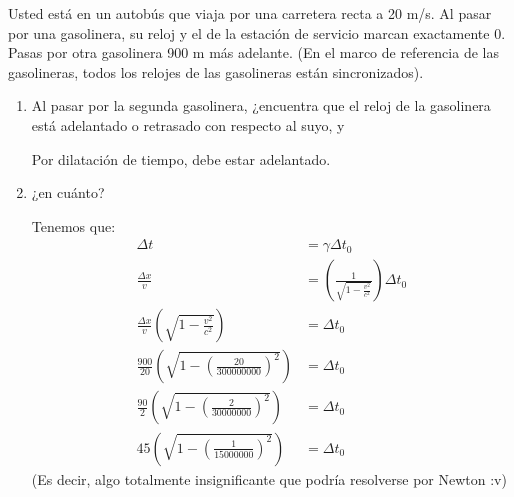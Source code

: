 \begin{problema}
    Usted está en un autobús que viaja por una carretera recta a 20 m/s. Al pasar por una gasolinera, su reloj y el de la estación de servicio marcan exactamente 0. Pasas por otra gasolinera 900 m más adelante. (En el marco de referencia de las gasolineras, todos los relojes de las gasolineras están sincronizados). 
\begin{enumerate}
    \item Al pasar por la segunda gasolinera, ¿encuentra que el reloj de la gasolinera está adelantado o retrasado con respecto al suyo, y
    \begin{sol}
        Por dilatación de tiempo, debe estar adelantado. 
    \end{sol} 
    \item ¿en cuánto?
    \begin{sol}
        Tenemos que: 
        \begin{align*}
            \Delta t &= \gamma \Delta t_0\\
            \frac{\Delta x}{v}&= \left(\frac{1}{\sqrt{1-\frac{v^2}{c^2}}}\right)\Delta t_0\\
            \frac{\Delta x}{v} \left(\sqrt{1-\frac{v^2}{c^2}}\right) &= \Delta t_0\\
            \frac{900}{20} \left(\sqrt{1-\left(\frac{20}{300000000}\right)^2}\right) &=\Delta t_0\\
            \frac{90}{2} \left(\sqrt{1-\left(\frac{2}{30000000}\right)^2}\right) &=\Delta t_0\\
            45 \left(\sqrt{1-\left(\frac{1}{15000000}\right)^2}\right) &=\Delta t_0
        \end{align*}
        (Es decir, algo totalmente insignificante que podría resolverse por Newton :v)
    \end{sol} 
\end{enumerate}

\end{problema}

